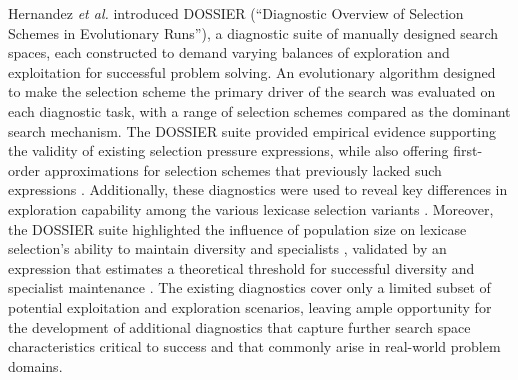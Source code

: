 

Hernandez \textit{et al.} \citep{hernandez2023beyond,hernandez2023suite} introduced DOSSIER (``Diagnostic Overview of Selection Schemes in Evolutionary Runs''), a diagnostic suite of manually designed search spaces, each constructed to demand varying balances of exploration and exploitation for successful problem solving.
An evolutionary algorithm designed to make the selection scheme the primary driver of the search was evaluated on each diagnostic task, with a range of selection schemes compared as the dominant search mechanism.
The DOSSIER suite provided empirical evidence supporting the validity of existing selection pressure expressions, while also offering first-order approximations for selection schemes that previously lacked such expressions \citep{hernandez2023beyond,hernandez2023suite}.
Additionally, these diagnostics were used to reveal key differences in exploration capability among the various lexicase selection variants \citep{hernandez2022exploration}. %
Moreover, the DOSSIER suite highlighted the influence of population size on lexicase selection's ability to maintain diversity and specialists \citep{hernandez2025params}, validated by an expression that estimates a theoretical threshold for successful diversity and specialist maintenance \citep{lacava2019probabilistic}.
The existing diagnostics cover only a limited subset of potential exploitation and exploration scenarios, leaving ample opportunity for the development of additional diagnostics that capture further search space characteristics critical to success and that commonly arise in real-world problem domains.

%



